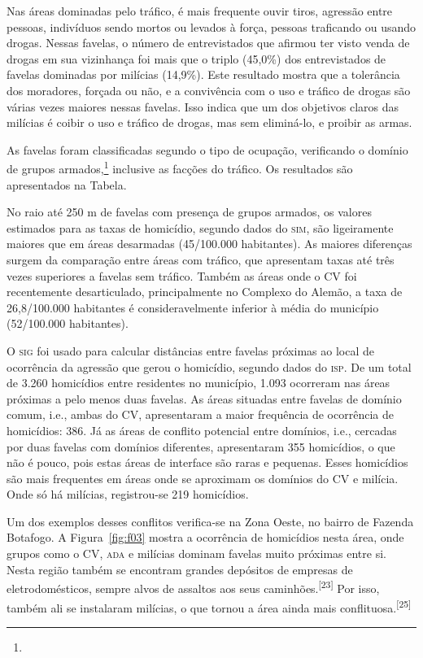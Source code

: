 \documentclass{article}
\begin{document}
Nas áreas dominadas pelo tráfico, é mais frequente ouvir tiros, agressão entre
pessoas, indivíduos sendo mortos ou levados à força, pessoas traficando ou
usando drogas. Nessas favelas, o número de entrevistados que afirmou ter visto
venda de drogas em sua vizinhança foi mais que o triplo (45,0\%) dos
entrevistados de favelas dominadas por milícias (14,9\%). Este resultado mostra
que a tolerância dos moradores, forçada ou não, e a convivência com o uso e
tráfico de drogas são várias vezes maiores nessas favelas. Isso indica que um
dos objetivos claros das milícias é coibir o uso e tráfico de drogas, mas sem
eliminá-lo, e proibir as armas.

As favelas foram classificadas segundo o tipo de ocupação, verificando o domínio
de grupos armados,\footnote{}
inclusive as facções do tráfico. Os resultados são apresentados na Tabela.

No raio até 250 m de favelas com presença de grupos armados, os valores
estimados para as taxas de homicídio, segundo dados do \textsc{sim}, são ligeiramente
maiores que em áreas desarmadas (45/100.000 habitantes). As maiores diferenças
surgem da comparação entre áreas com tráfico, que apresentam taxas até três
vezes superiores a favelas sem tráfico. Também as áreas onde o CV foi
recentemente desarticulado, principalmente no Complexo do Alemão, a taxa de
26,8/100.000 habitantes é consideravelmente inferior à média do município
(52/100.000 habitantes).

O \textsc{sig} foi usado para calcular distâncias entre favelas próximas ao local de
ocorrência da agressão que gerou o homicídio, segundo dados do \textsc{isp}. De um total
de 3.260 homicídios entre residentes no município, 1.093 ocorreram nas áreas
próximas a pelo menos duas favelas. As áreas situadas entre favelas de domínio
comum, i.e., ambas do CV, apresentaram a maior frequência de ocorrência de
homicídios: 386. Já as áreas de conflito potencial entre domínios, i.e.,
cercadas por duas favelas com domínios diferentes, apresentaram 355 homicídios,
o que não é pouco, pois estas áreas de interface são raras e pequenas. Esses
homicídios são mais frequentes em áreas onde se aproximam os domínios do CV e
milícia. Onde só há milícias, registrou-se 219 homicídios.

Um dos exemplos desses conflitos verifica-se na Zona Oeste, no bairro de Fazenda
Botafogo. A Figura~\ref{fig:f03}
mostra a ocorrência de homicídios nesta área, onde grupos como o CV, \textsc{ada} e
milícias dominam favelas muito próximas entre si. Nesta região também se
encontram grandes depósitos de empresas de eletrodomésticos, sempre alvos de
assaltos aos seus caminhões.\textsuperscript{[}\textsuperscript{23}\textsuperscript{]}
Por isso, também ali se instalaram milícias, o que tornou a área ainda mais
conflituosa.\textsuperscript{[}\textsuperscript{25}\textsuperscript{]}
\end{document}
